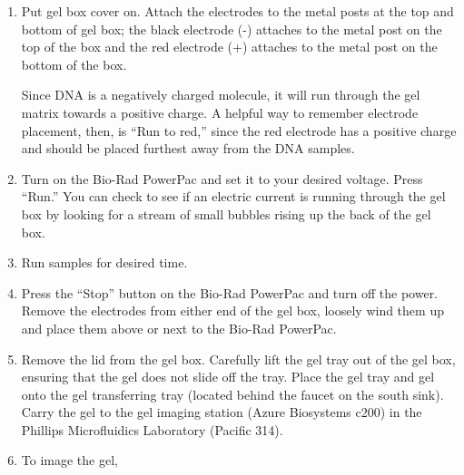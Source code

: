 \documentclass[
  letterpaper,
  DIV=11,
  numbers=noendperiod]{scrreprt}
\begin{document}
\begin{enumerate}
\begin{tcolorbox}
  \end{tcolorbox}
\item
  Put gel box cover on. Attach the electrodes to the metal posts at the
  top and bottom of gel box; the black electrode (-) attaches to the
  metal post on the top of the box and the red electrode (+) attaches to
  the metal post on the bottom of the box.

  \begin{tcolorbox}[enhanced jigsaw, rightrule=.15mm, title=\textcolor{quarto-callout-important-color}{\faExclamation}\hspace{0.5em}{NOTES}, titlerule=0mm, opacitybacktitle=0.6, toprule=.15mm, bottomrule=.15mm, opacityback=0, left=2mm, colframe=quarto-callout-important-color-frame, breakable, coltitle=black, colback=white, colbacktitle=quarto-callout-important-color!10!white, bottomtitle=1mm, leftrule=.75mm, toptitle=1mm, arc=.35mm]

  Since DNA is a negatively charged molecule, it will run through the
  gel matrix towards a positive charge. A helpful way to remember
  electrode placement, then, is ``Run to red,'' since the red electrode
  has a positive charge and should be placed furthest away from the DNA
  samples.

  \end{tcolorbox}
\item
  Turn on the Bio-Rad PowerPac and set it to your desired voltage. Press
  ``Run.'' You can check to see if an electric current is running
  through the gel box by looking for a stream of small bubbles rising up
  the back of the gel box.
\item
  Run samples for desired time.
\item
  Press the ``Stop'' button on the Bio-Rad PowerPac and turn off the
  power. Remove the electrodes from either end of the gel box, loosely
  wind them up and place them above or next to the Bio-Rad PowerPac.
\item
  Remove the lid from the gel box. Carefully lift the gel tray out of
  the gel box, ensuring that the gel does not slide off the tray. Place
  the gel tray and gel onto the gel transferring tray (located behind
  the faucet on the south sink). Carry the gel to the gel imaging
  station (Azure Biosystems c200) in the Phillips Microfluidics
  Laboratory (Pacific 314).
\item
  To image the gel,


\end{enumerate}
\end{document}
